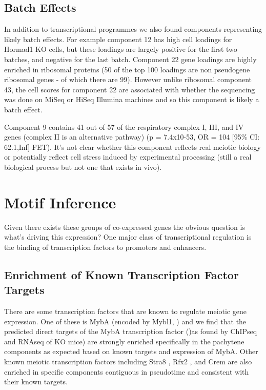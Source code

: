 \subsection{Batch Effects}

In addition to transcriptional programmes we also found components representing likely batch effects. For example component 12 has high cell loadings for Hormad1 KO cells, but these loadings are largely positive for the first two batches, and negative for the last batch. Component 22 gene loadings are highly enriched in ribosomal proteins (50 of the top 100 loadings are non pseudogene ribosomal genes - of which there are 99). However unlike ribosomal component 43, the cell scores for component 22 are associated with whether the sequencing was done on MiSeq or HiSeq Illumina machines and so this component is likely a batch effect.

Component 9 contains 41 out of 57 of the respiratory complex I, III, and IV genes (complex II is an alternative pathway) (p = 7.4x10-53, OR = 104 [95\% CI: 62.1,Inf] FET). It's not clear whether this component reflects real meiotic biology or potentially reflect cell stress induced by experimental processing (still a real biological process but not one that exists in vivo).

\section{Motif Inference}
Given there exists these groups of co-expressed genes the obvious question is what's driving this expression? One major class of transcriptional regulation is the binding of transcription factors to promoters and enhancers.

\subsection{Enrichment of Known Transcription Factor Targets}
There are some transcription factors that are known to regulate meiotic gene expression. One of these is MybA (encoded by Mybl1, \cite{Bolcun-Filas2011AMYB}) and we find that the predicted direct targets of the MybA transcription factor ()as found by ChIPseq and RNAseq of KO mice) are strongly enriched specifically in the pachytene components as expected based on known targets and expression of MybA. Other known meiotic transcription factors including Stra8 \parencite{Kojima2019Amplification}, Rfx2 \parencite{Kistler2015RFX2}, and Crem \parencite{Nantel1996Spermiogenesis} are also enriched in specific components contiguous in pseudotime and consistent with their known targets.


